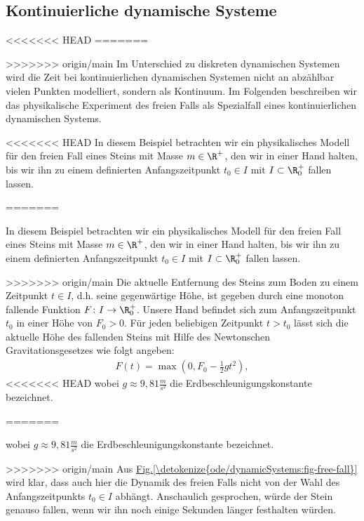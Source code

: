 \documentclass[letterpaper,10pt,english]{jupyterBook}
\begin{document}
\subsection{Kontinuierliche dynamische Systeme}
\label{\detokenize{ode/dynamicSystems:kontinuierliche-dynamische-systeme}}
<<<<<<< HEAD
=======
\par
>>>>>>> origin/main
Im Unterschied zu diskreten dynamischen Systemen wird die Zeit bei kontinuierlichen dynamischen Systemen nicht an abzählbar vielen Punkten modelliert, sondern als Kontinuum.
Im Folgenden beschreiben wir das physikalische Experiment des freien Falls als Spezialfall eines kontinuierlichen dynamischen Systems.
\label{ode/dynamicSystems:ex:freefall}
\begin{example}{}{}



<<<<<<< HEAD
In diesem Beispiel betrachten wir ein physikalisches Modell für den freien Fall eines Steins mit Masse \(m \in \R^+\), den wir in einer Hand halten, bis wir ihn zu einem definierten Anfangszeitpunkt \(t_0 \in I\) mit \(I \subset \R^+_0\) fallen lassen.

=======
\par
In diesem Beispiel betrachten wir ein physikalisches Modell für den freien Fall eines Steins mit Masse \(m \in \R^+\), den wir in einer Hand halten, bis wir ihn zu einem definierten Anfangszeitpunkt \(t_0 \in I\) mit \(I \subset \R^+_0\) fallen lassen.

\par
>>>>>>> origin/main
Die aktuelle Entfernung des Steins zum Boden zu einem Zeitpunkt \(t \in I\), d.h. seine gegenwärtige Höhe, ist gegeben durch eine monoton fallende Funktion \(F \colon I \rightarrow \R^+_0\).
Unsere Hand befindet sich zum Anfangszeitpunkt \(t_0\) in einer Höhe von \(F_0 > 0\).
Für jeden beliebigen Zeitpunkt \(t > t_0\) lässt sich die aktuelle Höhe des fallenden Steins mit Hilfe des Newtonschen Gravitationsgesetzes wie folgt angeben:
\begin{align*}
F(t) = \max(0, F_0 - \frac{1}{2}gt^2),
\end{align*}
<<<<<<< HEAD
wobei \(g \approx 9,81 \frac{m}{s^2}\) die Erdbeschleunigungskonstante bezeichnet.

=======
\par
wobei \(g \approx 9,81 \frac{m}{s^2}\) die Erdbeschleunigungskonstante bezeichnet.

\par
>>>>>>> origin/main
Aus \hyperref[\detokenize{ode/dynamicSystems:fig-free-fall}]{Fig.\@ \ref{\detokenize{ode/dynamicSystems:fig-free-fall}}} wird klar, dass auch hier die Dynamik des freien Falls nicht von der Wahl des Anfangszeitpunkts \(t_0 \in I\) abhängt.
Anschaulich gesprochen, würde der Stein genauso fallen, wenn wir ihn noch einige Sekunden länger festhalten würden.
\end{example}
\end{document}
